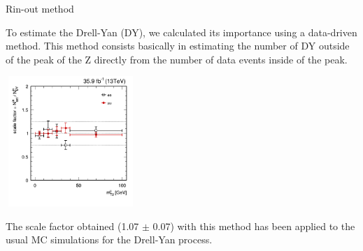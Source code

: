 \documentclass[8 pt]{beamer}
\begin{document}
\begin{frame}{Rin-out method}

	\justifying
	To estimate the Drell-Yan (DY), we calculated its importance using a data-driven method. This method consists basically in estimating the number of DY outside of the peak of the Z directly from the number of data events inside of the peak. \vfill

	\begin{center}
		\includegraphics[width= 140pt, height= 140pt]{figs/dy_scale-4.png} \\
	\end{center}
	
	The scale factor obtained (1.07 $\pm$ 0.07) with this method has been applied to the usual MC simulations for the Drell-Yan process. \vfill

\end{frame}
\end{document}
